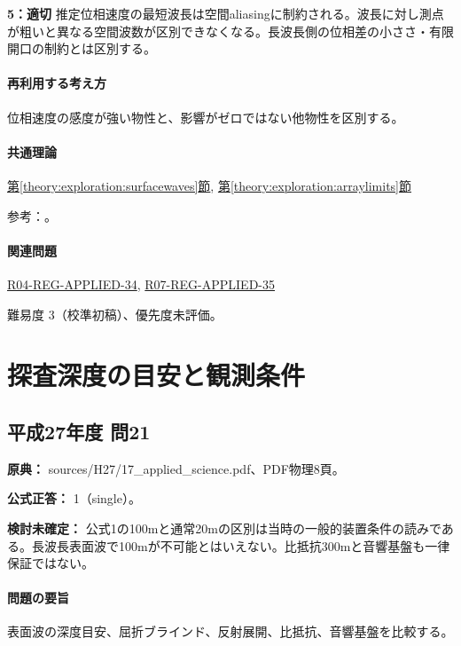 \noindent\textbf{5：適切} 推定位相速度の最短波長は空間aliasingに制約される。波長に対し測点が粗いと異なる空間波数が区別できなくなる。長波長側の位相差の小ささ・有限開口の制約とは区別する。\par

\paragraph{再利用する考え方} 位相速度の感度が強い物性と、影響がゼロではない他物性を区別する。

\paragraph{共通理論} \hyperref[theory:exploration:surfacewaves]{第\ref*{theory:exploration:surfacewaves}節}, \hyperref[theory:exploration:arraylimits]{第\ref*{theory:exploration:arraylimits}節}

\par 参考：\cite{epa_surfacewaves,xia_rayleigh1999,japansea_spac2017,array_limits2002}。

\paragraph{関連問題} \hyperref[q:r04-reg-applied-34]{R04-REG-APPLIED-34}, \hyperref[q:r07-reg-applied-35]{R07-REG-APPLIED-35}

\par 難易度 3（校準初稿）、優先度未評価。

\section{探査深度の目安と観測条件}

\subsection{平成27年度 問21}
\label{q:h27-reg-applied-21}

\noindent\textbf{原典：} sources/H27/17\_applied\_science.pdf、PDF物理8頁。

\textbf{公式正答：} 1（single）。

\par\textbf{検討未確定：} 公式1の100mと通常20mの区別は当時の一般的装置条件の読みである。長波長表面波で100mが不可能とはいえない。比抵抗300mと音響基盤も一律保証ではない。

\paragraph{問題の要旨} 表面波の深度目安、屈折ブラインド、反射展開、比抵抗、音響基盤を比較する。

